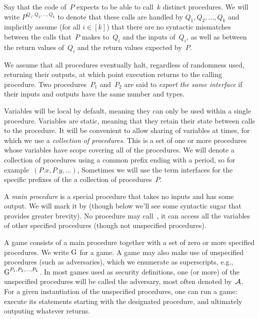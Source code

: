 Say that the code of~$P$ expects to be able to call~$k$ distinct procedures.
We will write $P^{Q_1,Q_2,\ldots,Q_k}$ to denote that these calls are
handled by $Q_1,Q_2,\ldots,Q_k$ and implicitly assume (for all $i\in[k]$) that there are no
syntactic mismatches between the calls that~$P$ makes to~$Q_i$ and the inputs
of~$Q_i$, as well as between the return values of~$Q_i$
and the return values expected by~$P$.   

We assume that all procedures eventually halt, regardless of randomness used, 
returning their outputs, at which point execution returns to the 
calling procedure.
Two procedures~$P_1$ and~$P_2$ are said to 
\emph{export the same interface} 
if their inputs and outputs have the same number and types. 

Variables will be local by default, meaning they can only be used within a
single procedure. Variables are static, meaning that they retain their 
state between calls to the procedure. It will be convenient to 
allow sharing of variables at times, for which we use a 
\textit{collection of procedures}. This is a set 
of one or more procedures whose variables have scope covering all of the
procedures. We will denote a collection of procedures using 
a common prefix ending with a period, so for example~$(P.x,P.y,\ldots)$,
Sometimes we will use the term interfaces for the specific prefixes of the a
collection of procedures~$P$. 

A \emph{main procedure} is a special procedure that takes no inputs and has some
output.  We will mark it by \main{} (though below
we'll see some syntactic sugar that provides greater brevity).  No procedure may
call~\main{}, it can access all the variables of other specified procedures
(though not unspecified procedures). 

A game consists of a main procedure together with a set of zero or more
specified procedures. We write ${{\textnormal G}}$ for a game. A game may also make use of
unspecified procedures (such as adversaries), which we enumerate as
superscripts, e.g., ${{\textnormal G}}^{P_1,P_2,\ldots,P_k}$. In most games used as security
definitions, one (or more) of the unspecified procedures will be called the
adversary, most often denoted by~${\mathcal A}$. For a given instantiation of the
unspecified procedures, one can run a game: execute its
statements starting with the designated \main{} procedure, and ultimately
outputing whatever \main{} returns.  

